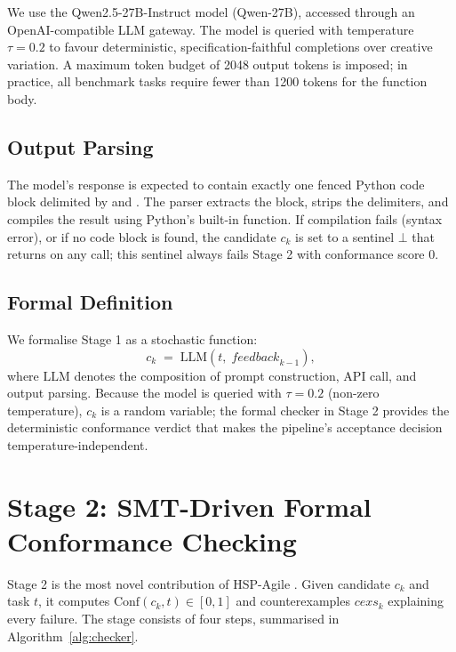 We use the Qwen2.5-27B-Instruct model (\textsf{Qwen-27B}), accessed through an
OpenAI-compatible LLM gateway.  The model is queried with temperature $\tau = 0.2$ to
favour deterministic, specification-faithful completions over creative
variation.  A maximum token budget of 2048 output tokens is imposed; in
practice, all benchmark tasks require fewer than 1200 tokens for the function
body.

\subsection{Output Parsing}
\label{subsec:method:parsing}

The model's response is expected to contain exactly one fenced Python code
block delimited by  and .  The parser extracts the
block, strips the delimiters, and compiles the result using Python's built-in
 function.  If compilation fails (syntax error), or if no
code block is found, the candidate $c_k$ is set to a sentinel
$\bot$ that returns  on any call; this sentinel always fails Stage 2
with conformance score 0.

\subsection{Formal Definition}
\label{subsec:method:synth-formal}

We formalise Stage 1 as a stochastic function:
\begin{equation}
  c_k \;=\; \mathrm{LLM}\!\left(t,\;\mathit{feedback}_{k-1}\right),
  \label{eq:synthesis}
\end{equation}
where $\mathrm{LLM}$ denotes the composition of prompt construction, API
call, and output parsing.  Because the model is queried with $\tau = 0.2$
(non-zero temperature), $c_k$ is a random variable; the formal checker in
Stage 2 provides the deterministic conformance verdict that makes the
pipeline's acceptance decision temperature-independent.

\section{Stage 2: SMT-Driven Formal Conformance Checking}
\label{sec:method:checker}

Stage 2 is the most novel contribution of HSP-Agile \citep{demoura2008z3, barrett2018smt}.
Given candidate $c_k$ and task $t$, it computes $\mathrm{Conf}(c_k, t) \in
[0,1]$ and counterexamples $\mathit{cexs}_k$ explaining every failure.
The stage consists of four steps, summarised in Algorithm~\ref{alg:checker}.

